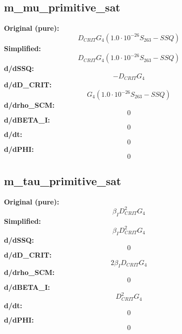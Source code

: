 \subsection{m_mu_primitive_sat}
\textbf{Original (pure):}
\begin{equation}
D_{CRIT} G_{4} \left(1.0 \cdot 10^{-26} S_{26 3} - SSQ\right)
\end{equation}
\textbf{Simplified:}
\begin{equation}
D_{CRIT} G_{4} \left(1.0 \cdot 10^{-26} S_{26 3} - SSQ\right)
\end{equation}
\textbf{d/dSSQ:}
\begin{equation}
- D_{CRIT} G_{4}
\end{equation}
\textbf{d/dD_CRIT:}
\begin{equation}
G_{4} \left(1.0 \cdot 10^{-26} S_{26 3} - SSQ\right)
\end{equation}
\textbf{d/drho_SCM:}
\begin{equation}
0
\end{equation}
\textbf{d/dBETA_I:}
\begin{equation}
0
\end{equation}
\textbf{d/dt:}
\begin{equation}
0
\end{equation}
\textbf{d/dPHI:}
\begin{equation}
0
\end{equation}

\subsection{m_tau_primitive_sat}
\textbf{Original (pure):}
\begin{equation}
\beta_{I} D_{CRIT}^{2} G_{4}
\end{equation}
\textbf{Simplified:}
\begin{equation}
\beta_{I} D_{CRIT}^{2} G_{4}
\end{equation}
\textbf{d/dSSQ:}
\begin{equation}
0
\end{equation}
\textbf{d/dD_CRIT:}
\begin{equation}
2 \beta_{I} D_{CRIT} G_{4}
\end{equation}
\textbf{d/drho_SCM:}
\begin{equation}
0
\end{equation}
\textbf{d/dBETA_I:}
\begin{equation}
D_{CRIT}^{2} G_{4}
\end{equation}
\textbf{d/dt:}
\begin{equation}
0
\end{equation}
\textbf{d/dPHI:}
\begin{equation}
0
\end{equation}

